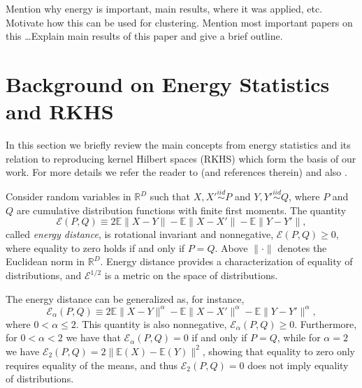 \documentclass[aps,preprint,nofootinbib,floatfix]{revtex4-1}
\newcommand\Energy{\mathcal{E}}
\newcommand\E{\mathbb{E}}
\begin{document}
Mention why energy is important, main results, where it was applied, etc.
Motivate how this can be used for clustering. Mention most important
papers on this \ldots Explain main results of this paper and give a brief
outline.


\section{Background on Energy Statistics and RKHS}
\label{sec:background}

In this section we briefly review the main concepts from energy
statistics and its relation to reproducing kernel Hilbert spaces 
(RKHS) which form the basis of our work.
For more details we refer the reader
to \cite{Szkely2013} (and references therein) and 
also \cite{Sejdinovic2013}.

Consider random variables in $\mathbb{R}^D$ 
such that $X,X' \stackrel{iid}{\sim} P$ and 
$Y,Y' \stackrel{iid}{\sim} Q$, where $P$ and $Q$ are cumulative
distribution functions with finite first moments. 
The quantity \cite{Szkely2013}
\begin{equation}
\label{eq:energy}
\Energy(P, Q) \equiv 2 \E \| X - Y\| - \E \| X - X' \| - \E \| Y - Y' \|,
\end{equation}
called \emph{energy distance}, 
is rotational invariant and nonnegative, $\Energy(P,Q) \ge 0$, where
equality
to zero holds if and only if $P = Q$.
Above $\| \cdot \|$ denotes the
Euclidean norm in $\mathbb{R}^D$. 
Energy distance
provides a characterization of equality of distributions, and
$\Energy^{1/2}$ is
a metric on the space of distributions.

The energy distance can be generalized as, for instance,
\begin{equation}
\label{eq:energy2}
\Energy_\alpha(P, Q) \equiv 
2 \E \| X - Y\|^{\alpha} - \E \| X - X' \|^{\alpha} - 
\E \| Y - Y' \|^{\alpha},
\end{equation}
where $0<\alpha\le 2$. This quantity is also nonnegative,
$\Energy_\alpha(P,Q) \ge 0$. Furthermore, for $0<\alpha<2$ we have that
$\Energy_\alpha(P,Q) = 0$ if and only if $P=Q$, while for $\alpha=2$ 
we have $\Energy_2(P,Q) = 2\| \E(X) - \E(Y) \|^2$, showing that
equality to zero only requires
equality of the means, and thus $\Energy_2(P,Q)=0$ does 
not imply equality of distributions.
\end{document}
